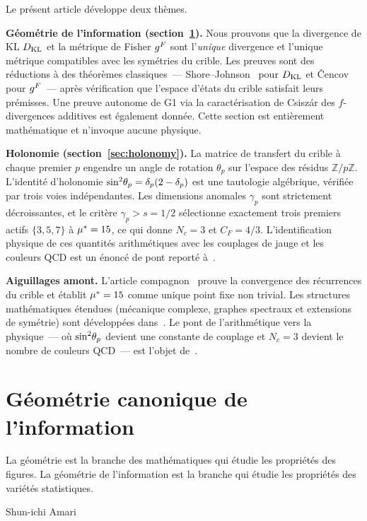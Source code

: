 \documentclass[12pt,a4paper]{article}
\begin{document}
Le présent article développe deux thèmes.

\textbf{Géométrie de l'information (section~\ref{sec:geometry}).}
Nous prouvons que la divergence de KL $D_{\mathrm{KL}}$ et la métrique de Fisher
$g^F$ sont l'\emph{unique} divergence et l'unique métrique
compatibles avec les symétries du crible. Les preuves sont des
réductions à des théorèmes
classiques~--- Shore--Johnson~\cite{ShoreJohnson1980} pour $D_{\mathrm{KL}}$ et
\v{C}encov~\cite{Cencov1982} pour $g^F$~--- après vérification que
l'espace d'états du crible satisfait leurs prémisses. Une preuve
autonome de G1 via la caractérisation de Csisz\'ar des $f$-divergences
additives est également donnée. Cette section est entièrement
mathématique et n'invoque aucune physique.

\textbf{Holonomie (section~\ref{sec:holonomy}).}
La matrice de transfert du crible à chaque premier $p$ engendre un
angle de rotation $\theta_p$ sur l'espace des résidus
$\mathbb{Z}/p\mathbb{Z}$. L'identité d'holonomie
$\sin^2\!\theta_{p} = \delta_p(2 - \delta_p)$ est une tautologie algébrique,
vérifiée par trois voies indépendantes. Les dimensions anomales
$\gamma_p$ sont strictement décroissantes, et le critère
$\gamma_p > s = 1/2$ sélectionne exactement trois premiers actifs
$\{3, 5, 7\}$ à ${\mu^{*}} = 15$, ce qui donne $N_c = 3$ et
$C_F = 4/3$. L'identification physique de ces quantités arithmétiques
avec les couplages de jauge et les couleurs QCD est un énoncé de pont
reporté à~\cite{companion_M5}.

\medskip\noindent\textbf{Aiguillages amont.}
L'article compagnon~\cite{companion_M3} prouve la convergence des
récurrences du crible et établit ${\mu^{*}} = 15$ comme unique point
fixe non trivial. Les structures mathématiques étendues (mécanique
complexe, graphes spectraux et extensions de symétrie) sont développées
dans~\cite{companion_M4}. Le pont de l'arithmétique vers la
physique~--- où $\sin^2\!\theta_{p}$ devient une constante de couplage et
$N_c = 3$ devient le nombre de couleurs QCD~--- est l'objet
de~\cite{companion_M5}.

\section{Géométrie canonique de l'information}
\label{sec:geometry}

\epigraph{La géométrie est la branche des mathématiques qui étudie les propriétés
des figures. La géométrie de l'information est la branche qui étudie
les propriétés des variétés statistiques.}{Shun-ichi Amari}
\end{document}
